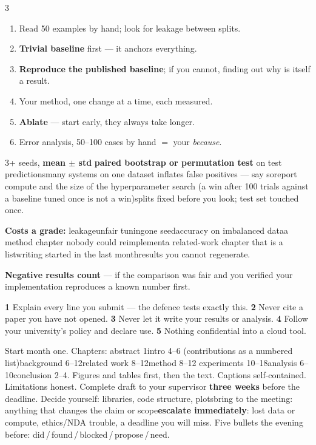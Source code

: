 \documentclass[10pt,a4paper]{article}
\begin{document}
\begin{multicols}{3}
\begin{enumerate}
  \item Read 50 examples by hand; look for leakage between splits.
  \item \textbf{Trivial baseline} first --- it anchors everything.
  \item \textbf{Reproduce the published baseline}; if you cannot, finding out
        why is itself a result.
  \item Your method, one change at a time, each measured.
  \item \textbf{Ablate} --- start early, they always take longer.
  \item Error analysis, 50--100 cases by hand $=$ your \emph{because}.
\end{enumerate}
3+ seeds, \textbf{mean $\pm$ std}\dt
\textbf{paired bootstrap or permutation test} on test predictions\dt many
systems on one dataset inflates false positives --- say so\dt report compute
and the size of the hyperparameter search (a win after 100 trials against a
baseline tuned once is not a win)\dt splits fixed before you look; test set
touched once.
\begin{flag}
\textbf{Costs a grade:} leakage\dt unfair tuning\dt one seed\dt accuracy on
imbalanced data\dt a method chapter nobody could reimplement\dt a related-work
chapter that is a list\dt writing started in the last month\dt results you
cannot regenerate.
\end{flag}
\textbf{Negative results count} --- if the comparison was fair and you verified
your implementation reproduces a known number first.

\columnbreak
{}
\begin{flag}
\textbf{1} Explain every line you submit --- the defence tests exactly this.
\textbf{2} Never cite a paper you have not opened. \textbf{3} Never let it
write your results or analysis. \textbf{4} Follow your university's policy and
declare use. \textbf{5} Nothing confidential into a cloud tool.
\end{flag}

Start month one. Chapters: abstract 1\dt intro 4--6 (contributions as a
numbered list)\dt background 6--12\dt related work 8--12\dt method 8--12\dt
experiments 10--18\dt analysis 6--10\dt conclusion 2--4. Figures and tables
first, then the text. Captions self-contained. Limitations honest. Complete
draft to your supervisor \textbf{three weeks} before the deadline.
Decide yourself: libraries, code structure, plots\dt bring to
the meeting: anything that changes the claim or scope\dt \textbf{escalate
immediately}: lost data or compute, ethics/NDA trouble, a deadline you will
miss. Five bullets the evening before: did\,/\,found\,/\,blocked\,/\,propose\,/\,need.


\end{multicols}
\end{document}
